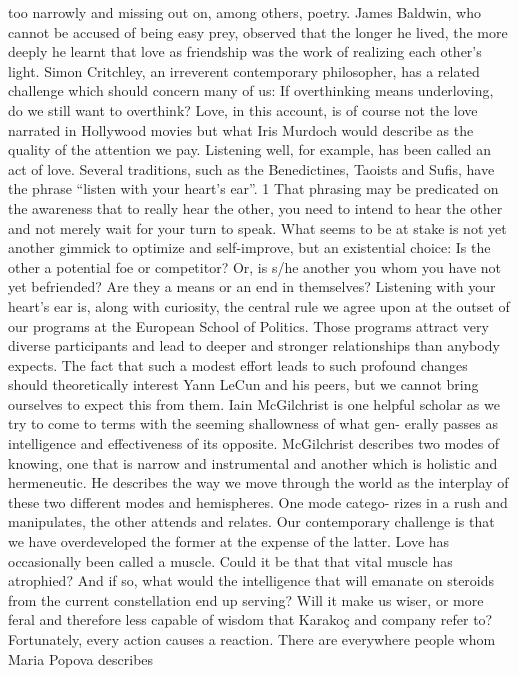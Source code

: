 too narrowly and missing out on, among others, poetry. James Baldwin, who cannot be accused of being
easy prey, observed that the longer he lived, the more deeply he learnt that love as friendship was the work
of realizing each other’s light.
Simon Critchley, an irreverent contemporary philosopher, has a related challenge which should concern many
of us: If overthinking means underloving, do we still want to overthink?
Love, in this account, is of course not the love narrated in Hollywood movies but what Iris Murdoch would
describe as the quality of the attention we pay. Listening well, for example, has been called an act of love.
Several traditions, such as the Benedictines, Taoists and Sufis, have the phrase “listen with your heart’s ear”.
1
That phrasing may be predicated on the awareness that to really hear the other, you need to intend to hear the
other and not merely wait for your turn to speak.
What seems to be at stake is not yet another gimmick to optimize and self-improve, but an existential choice:
Is the other a potential foe or competitor? Or, is s/he another you whom you have not yet befriended? Are
they a means or an end in themselves?
Listening with your heart’s ear is, along with curiosity, the central rule we agree upon at the outset of our
programs at the European School of Politics. Those programs attract very diverse participants and lead to
deeper and stronger relationships than anybody expects. The fact that such a modest effort leads to such
profound changes should theoretically interest Yann LeCun and his peers, but we cannot bring ourselves to
expect this from them.
Iain McGilchrist is one helpful scholar as we try to come to terms with the seeming shallowness of what gen-
erally passes as intelligence and effectiveness of its opposite. McGilchrist describes two modes of knowing,
one that is narrow and instrumental and another which is holistic and hermeneutic. He describes the way we
move through the world as the interplay of these two different modes and hemispheres. One mode catego-
rizes in a rush and manipulates, the other attends and relates. Our contemporary challenge is that we have
overdeveloped the former at the expense of the latter. Love has occasionally been called a muscle. Could it
be that that vital muscle has atrophied? And if so, what would the intelligence that will emanate on steroids
from the current constellation end up serving? Will it make us wiser, or more feral and therefore less capable
of wisdom that Karakoç and company refer to?
Fortunately, every action causes a reaction. There are everywhere people whom Maria Popova describes
